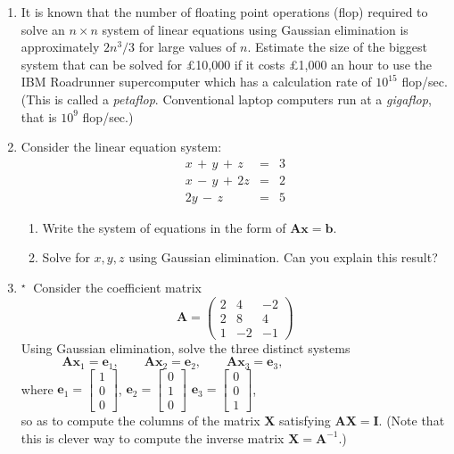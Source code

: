 \documentclass[11pt,a4paper]{article}
\def\bA{\mathbf{A}}
\def\bI{\mathbf{I}}
\def\bX{\mathbf{X}}
\def\tough{$\!\!\!{}^\star\>$}
\begin{document}
\begin{enumerate}
\begin{enumerate}
       \end{enumerate}

\item\label{qdjsx1} 
It is known  that the number of floating point operations (flop) required to solve
an $n\times n$ system of linear equations using Gaussian elimination
is approximately $2 n^3 /3$ for large values of $n$. Estimate the 
size of the biggest system that 
can be solved for \pounds 10,000 if it costs \pounds 1,000 an hour to
use the IBM Roadrunner supercomputer which has a calculation rate of $10^{15}$ flop/sec. 
(This is called a {\it petaflop}. Conventional laptop computers run  at  a  {\it gigaflop},  that is $10^{9}$ flop/sec.)

\item\label{q1207} Consider the linear equation system:
\begin{eqnarray*}
x\,+\,y\,+\,z&=&3\\
x\,-\,y\,+\,2z&=&2\\
2y\,-\,z&=&5
\end{eqnarray*}
            \begin{enumerate}
            \item Write the system of  equations in the form of $\bA \mathbf{x}=\mathbf{b}$.
            \item  Solve for $x,y,z$ using Gaussian elimination.
             Can you explain this result? 
            \end{enumerate}

%


\item\label{qdjsx2} \tough
Consider the coefficient matrix
 $$ \bA = \left ( \begin{array}{rrrr}
         2 & 4 & -2  \\
        2 &  8& 4 \\
        1  & -2 & -1
         \end{array} \right )$$
   Using Gaussian elimination,  solve the three distinct systems 
  $$ \bA  \mathbf{x}_1=\mathbf{e}_1,\qquad  \bA  \mathbf{x}_2=\mathbf{e}_2, 
   \qquad\bA  \mathbf{x}_3=\mathbf{e}_3,\qquad\qquad\qquad\qquad\qquad $$
  where $\mathbf{e}_1=  \left[ \begin{array}{c} 1 \\ 0\\ 0 \end{array} \right]$, 
   $\mathbf{e}_2=  \left[ \begin{array}{c} 0 \\ 1\\ 0 \end{array} \right]$
    $\mathbf{e}_3=  \left[ \begin{array}{c} 0 \\ 0\\ 1 \end{array} \right]$, \\[2ex]
  so as to  compute the columns of the matrix   $\bX$ satisfying $\bA \bX = \bI$.  (Note that this is
  clever way to compute the inverse matrix $\bX= \bA^{-1}$.)  



\end{enumerate}
\end{document}

